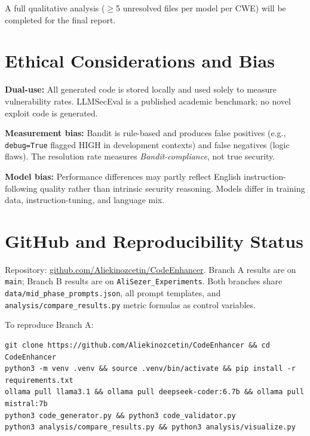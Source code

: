 \documentclass[11pt,a4paper]{article}
\begin{document}
A full qualitative analysis ($\geq$5 unresolved files per model per CWE) will be completed for the final report.

\section{Ethical Considerations and Bias}

\textbf{Dual-use:} All generated code is stored locally and used solely to measure vulnerability rates. LLMSecEval is a published academic benchmark; no novel exploit code is generated.

\textbf{Measurement bias:} Bandit is rule-based and produces false positives (e.g., \texttt{debug=True} flagged HIGH in development contexts) and false negatives (logic flaws). The resolution rate measures \emph{Bandit-compliance}, not true security.

\textbf{Model bias:} Performance differences may partly reflect English instruction-following quality rather than intrinsic security reasoning. Models differ in training data, instruction-tuning, and language mix.

\section{GitHub and Reproducibility Status}

Repository: \href{https://github.com/Aliekinozcetin/CodeEnhancer}{github.com/Aliekinozcetin/CodeEnhancer}. Branch A results are on \texttt{main}; Branch B results are on \texttt{AliSezer\_Experiments}. Both branches share \texttt{data/mid\_phase\_prompts.json}, all prompt templates, and \texttt{analysis/compare\_results.py} metric formulas as control variables.

To reproduce Branch A:
\begin{verbatim}
git clone https://github.com/Aliekinozcetin/CodeEnhancer && cd CodeEnhancer
python3 -m venv .venv && source .venv/bin/activate && pip install -r requirements.txt
ollama pull llama3.1 && ollama pull deepseek-coder:6.7b && ollama pull mistral:7b
python3 code_generator.py && python3 code_validator.py
python3 analysis/compare_results.py && python3 analysis/visualize.py
\end{verbatim}

\end{document}
